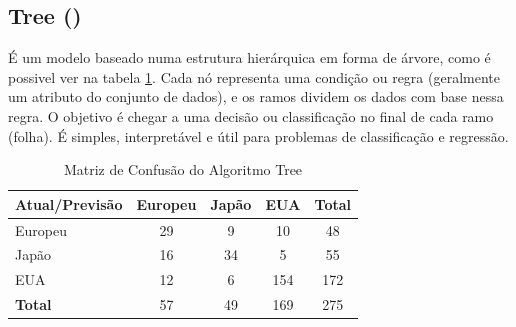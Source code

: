 \documentclass[conference]{IEEEtran}
\begin{document}
\subsection{Tree (\cite{tree})}
É um modelo baseado numa estrutura hierárquica em forma de árvore, como é possivel ver na tabela \ref{tab:conf_matrix_tree}.
Cada nó representa uma condição ou regra (geralmente um atributo do conjunto de dados), e os ramos dividem os dados com base
nessa regra. O objetivo é chegar a uma decisão ou classificação no final de cada ramo (folha). É simples, interpretável e
útil para problemas de classificação e regressão.
\begin{table}[!ht]
	\centering
	\begin{tabular}{lcccc}
		\toprule
		\textbf{Atual/Previsão} & \textbf{Europeu} & \textbf{Japão} & \textbf{EUA} & \textbf{Total} \\
		\midrule
		Europeu                 & 29               & 9             & 10           & 48             \\
		Japão                   & 16               & 34             & 5           & 55             \\
		EUA                     & 12               & 6             & 154          & 172            \\
		\midrule
		\textbf{Total}          & 57               & 49             & 169          & 275            \\
		\bottomrule
	\end{tabular}
	\caption{Matriz de Confusão do Algoritmo Tree}
	\label{tab:conf_matrix_tree}

\end{table}

\end{document}
